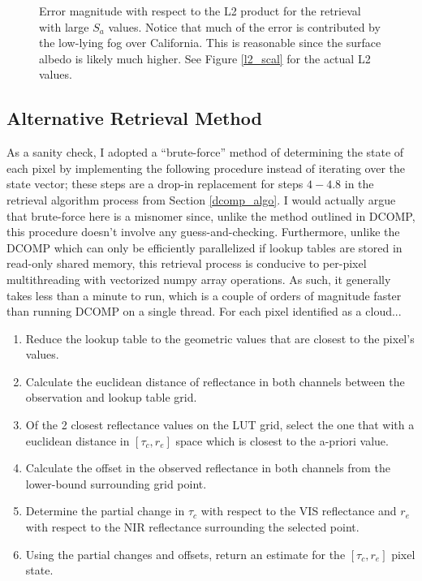 \documentclass[12pt]{article}
\begin{document}
\begin{figure}[h!]
\begin{center}
{        }
    \end{center}
    \caption{Error magnitude with respect to the L2 product for the retrieval with large $S_a$ values. Notice that much of the error is contributed by the low-lying fog over California. This is reasonable since the surface albedo is likely much higher. See Figure \ref{l2_scal} for the actual L2 values.}
    \label{big_sa_err}
\end{figure}

\vspace{-2em}

\subsection{Alternative Retrieval Method}

As a sanity check, I adopted a ``brute-force'' method of determining the state of each pixel by implementing the following procedure instead of iterating over the state vector; these steps are a drop-in replacement for steps $4-4.8$ in the retrieval algorithm process from Section \ref{dcomp_algo}. I would actually argue that brute-force here is a misnomer since, unlike the method outlined in DCOMP, this procedure doesn't involve any guess-and-checking. Furthermore, unlike the DCOMP which can only be efficiently parallelized if lookup tables are stored in read-only shared memory, this retrieval process is conducive to per-pixel multithreading with vectorized numpy array operations. As such, it generally takes less than a minute to run, which is a couple of orders of magnitude faster than running DCOMP on a single thread.  For each pixel identified as a cloud...

\begin{enumerate}
    \setlength\itemsep{-.2em}
    \item Reduce the lookup table to the geometric values that are closest to the pixel's values.
    \item Calculate the euclidean distance of reflectance in both channels between the observation and lookup table grid.
    \item Of the 2 closest reflectance values on the LUT grid, select the one that with a euclidean distance in $[\tau_c, r_e]$ space which is closest to the a-priori value.
    \item Calculate the offset in the observed reflectance in both channels from the lower-bound surrounding grid point.
    \item Determine the partial change in $\tau_c$ with respect to the VIS reflectance and $r_e$ with respect to the NIR reflectance surrounding the selected point.
    \item Using the partial changes and offsets, return an estimate for the $[\tau_c, r_e]$ pixel state.
\end{enumerate}
\end{document}

